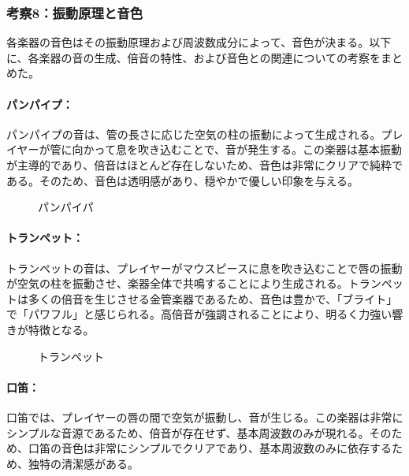 \documentclass{article}
\begin{document}
\subsubsection{考察8：振動原理と音色}
\begin{spacing}{1.2}
    各楽器の音色はその振動原理および周波数成分によって、音色が決まる。以下に、各楽器の音の生成、倍音の特性、および音色との関連についての考察をまとめた。
    \paragraph*{パンパイプ：}
    パンパイプの音は、管の長さに応じた空気の柱の振動によって生成される。プレイヤーが管に向かって息を吹き込むことで、音が発生する。この楽器は基本振動が主導的であり、倍音はほとんど存在しないため、音色は非常にクリアで純粋である。そのため、音色は透明感があり、穏やかで優しい印象を与える。
    \begin{figure}[ht] %
        \centering
        \caption{パンパイパ}
    \end{figure}
    \FloatBarrier
    \paragraph*{トランペット：} 
    トランペットの音は、プレイヤーがマウスピースに息を吹き込むことで唇の振動が空気の柱を振動させ、楽器全体で共鳴することにより生成される。トランペットは多くの倍音を生じさせる金管楽器であるため、音色は豊かで、「ブライト」で「パワフル」と感じられる。高倍音が強調されることにより、明るく力強い響きが特徴となる。
    \begin{figure}[ht] %
        \centering
        \caption{トランペット}
    \end{figure}
    \FloatBarrier
    \paragraph*{口笛：}
    口笛では、プレイヤーの唇の間で空気が振動し、音が生じる。この楽器は非常にシンプルな音源であるため、倍音が存在せず、基本周波数のみが現れる。そのため、口笛の音色は非常にシンプルでクリアであり、基本周波数のみに依存するため、独特の清潔感がある。

\end{spacing}
\end{document}
